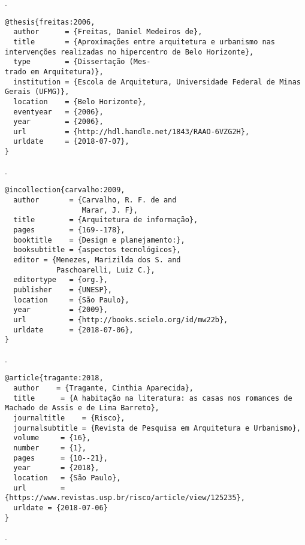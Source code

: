 \noindent
{}.

\vspace*{1em}

\begin{verbatim}
@thesis{freitas:2006,
  author      = {Freitas, Daniel Medeiros de},
  title       = {Aproximações entre arquitetura e urbanismo nas intervenções realizadas no hipercentro de Belo Horizonte},
  type        = {Dissertação (Mes-
trado em Arquitetura)},
  institution = {Escola de Arquitetura, Universidade Federal de Minas Gerais (UFMG)},
  location    = {Belo Horizonte},
  eventyear   = {2006},
  year        = {2006},
  url         = {http://hdl.handle.net/1843/RAAO-6VZG2H},
  urldate     = {2018-07-07},
}
\end{verbatim}

\noindent
{}.

\vspace*{1em}

\begin{verbatim}
@incollection{carvalho:2009,
  author       = {Carvalho, R. F. de and
                  Marar, J. F},
  title        = {Arquitetura de informação},
  pages        = {169--178},
  booktitle    = {Design e planejamento:},
  booksubtitle = {aspectos tecnológicos},
  editor = {Menezes, Marizilda dos S. and
            Paschoarelli, Luiz C.},
  editortype   = {org.},
  publisher    = {UNESP},
  location     = {São Paulo},
  year         = {2009},
  url          = {http://books.scielo.org/id/mw22b},
  urldate      = {2018-07-06},
}
\end{verbatim}

\noindent
{}.

\vspace*{1em}

\begin{verbatim}
@article{tragante:2018,
  author    = {Tragante, Cinthia Aparecida},
  title      = {A habitação na literatura: as casas nos romances de Machado de Assis e de Lima Barreto},
  journaltitle    = {Risco},
  journalsubtitle = {Revista de Pesquisa em Arquitetura e Urbanismo},
  volume     = {16},
  number     = {1},
  pages      = {10--21},
  year       = {2018},
  location   = {São Paulo},
  url        = {https://www.revistas.usp.br/risco/article/view/125235},
  urldate = {2018-07-06}
}
\end{verbatim}

\noindent
{}.

\vspace*{1em}

